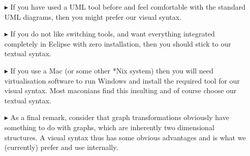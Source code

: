 \begin{itemize}

\item[$\blacktriangleright$] If you have used a UML tool before and feel comfortable with the standard UML diagrams, then you might prefer our visual syntax.

\item[$\blacktriangleright$] If you do not like switching tools, and want everything integrated completely in Eclipse with zero installation, then you should stick to our textual syntax.

\item[$\blacktriangleright$] If you use a Mac (or some other *Nix system) then you will need virtualisation software to run Windows and install the required tool for our visual syntax. 
Most maconians find this insulting and of course choose our textual syntax.

\item[$\blacktriangleright$] As a final remark, consider that graph transformations obviously have something to do with graphs, which are inherently two dimensional structures. 
A visual syntax thus has some obvious advantages and is what we (currently) prefer and use internally.

\end{itemize}

